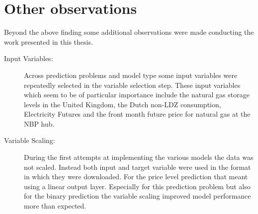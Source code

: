 \section{Other observations}
Beyond the above finding some additional observations were made conducting the work presented in this thesis.
\begin{description}
\item[Input Variables:] Across prediction problems and model type some input variables were repeatedly selected in the variable selection step. These input variables which seem to be of particular importance include the natural gas storage levels in the United Kingdom, the Dutch non-LDZ consumption, Electricity Futures and the front month future price for natural gas at the NBP hub.
\item[Variable Scaling:] During the first attempts at implementing the various models the data was not scaled. Instead both input and target variable were used in the format in which they were downloaded. For the price level prediction that meant using a linear output layer. Especially for this prediction problem but also for the binary prediction the variable scaling improved model performance more than expected.
\end{description}
